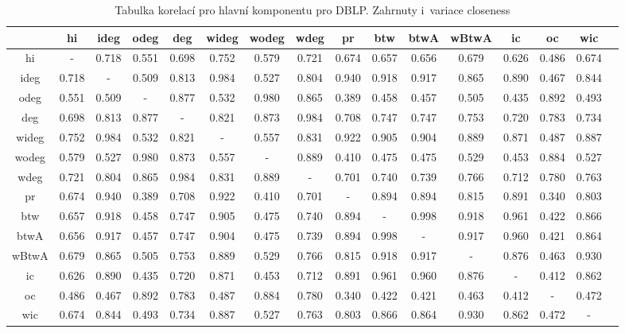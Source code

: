 \documentclass{bakalarka}
\begin{document}
\begin{table}[!ht]
\centering
\caption{Tabulka korelací pro hlavní komponentu pro DBLP. Zahrnuty i~variace closeness}
\label{tab:corr2}
\begin{sideways}
\begin{footnotesize}
\begin{tabular}{c|ccccccccccccccc}
\toprule
&hi  &ideg &odeg &deg  &wideg&wodeg&wdeg &pr   &btw  &btwA &wBtwA&ic   &oc   &wic\\
\midrule
hi   &  -  &0.718&0.551&0.698&0.752&0.579&0.721&0.674&0.657&0.656&0.679&0.626&0.486&0.674\\
ideg &0.718&  -  &0.509&0.813&0.984&0.527&0.804&0.940&0.918&0.917&0.865&0.890&0.467&0.844\\
odeg &0.551&0.509&  -  &0.877&0.532&0.980&0.865&0.389&0.458&0.457&0.505&0.435&0.892&0.493\\
deg  &0.698&0.813&0.877&  -  &0.821&0.873&0.984&0.708&0.747&0.747&0.753&0.720&0.783&0.734\\
wideg&0.752&0.984&0.532&0.821&  -  &0.557&0.831&0.922&0.905&0.904&0.889&0.871&0.487&0.887\\
wodeg&0.579&0.527&0.980&0.873&0.557&  -  &0.889&0.410&0.475&0.475&0.529&0.453&0.884&0.527\\
wdeg &0.721&0.804&0.865&0.984&0.831&0.889&  -  &0.701&0.740&0.739&0.766&0.712&0.780&0.763\\
pr   &0.674&0.940&0.389&0.708&0.922&0.410&0.701&  -  &0.894&0.894&0.815&0.891&0.340&0.803\\
btw  &0.657&0.918&0.458&0.747&0.905&0.475&0.740&0.894&  -  &0.998&0.918&0.961&0.422&0.866\\
btwA &0.656&0.917&0.457&0.747&0.904&0.475&0.739&0.894&0.998&  -  &0.917&0.960&0.421&0.864\\
wBtwA&0.679&0.865&0.505&0.753&0.889&0.529&0.766&0.815&0.918&0.917&  -  &0.876&0.463&0.930\\
ic   &0.626&0.890&0.435&0.720&0.871&0.453&0.712&0.891&0.961&0.960&0.876&  -  &0.412&0.862\\
oc   &0.486&0.467&0.892&0.783&0.487&0.884&0.780&0.340&0.422&0.421&0.463&0.412&  -  &0.472\\
wic  &0.674&0.844&0.493&0.734&0.887&0.527&0.763&0.803&0.866&0.864&0.930&0.862&0.472&  -  \\
\bottomrule
\end{tabular}
\end{footnotesize}
\end{sideways}
\end{table}
\end{document}
